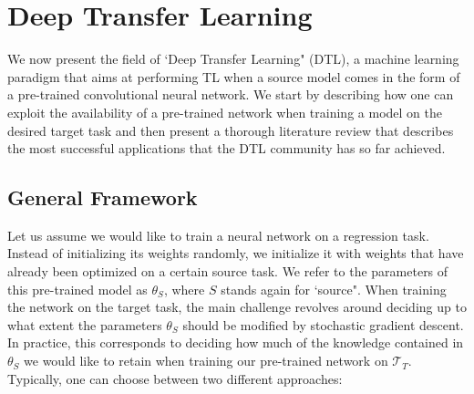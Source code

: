 \section{Deep Transfer Learning}
\label{sec:literature_review}

We now present the field of `Deep Transfer Learning" (DTL), a machine learning paradigm that aims at performing TL when a source model comes in the form of a pre-trained convolutional neural network. We start by describing how one can exploit the availability of a pre-trained network when training a model on the desired target task and then present a thorough literature review that describes the most successful applications that the DTL community has so far achieved.

\subsection{General Framework}
\label{sec:tl_general_framework}

Let us assume we would like to train a neural network on a regression task. Instead of initializing its weights randomly, we initialize it with weights that have already been optimized on a certain source task. We refer to the parameters of this pre-trained model as $\theta_S$, where $S$ stands again for `source". When training the network on the target task, the main challenge revolves around deciding up to what extent the parameters $\theta_S$ should be modified by stochastic gradient descent. In practice, this corresponds to deciding how much of the knowledge contained in $\theta_S$ we would like to retain when training our pre-trained network on $\mathcal{T}_T$. Typically, one can choose between two different approaches:  

